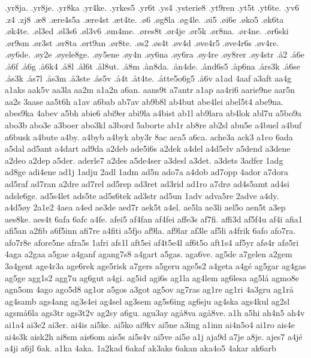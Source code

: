 .yr8ja.
.yr8je.
.yr8ka
.yr4ke.
.yrkes5
.yr6t
.ys4
.ysterie8
.yt9ren
.yt5t
.yt6te.
.yv6
.z4
.zj8
.^^e68
.^^e6re4s5a
.^^e6re4st
.^^e6t4te.
.^^f86
.^^f8g8la
.^^f8g4le.
.^^f8i5
.^^f8i6e
.^^f8ko5
.^^f8k6ta
.^^f8k4te.
.^^f8l3ed
.^^f8l3s6
.^^f8l3v6
.^^f8m4me.
.^^f8res8t
.^^f8r4je
.^^f8r5k
.^^f8r8na.
.^^f8r4ne.
.^^f8r6ski
.^^f8r9sm
.^^f8r3st
.^^f8r8ta
.^^f8rt9an
.^^f8r8te.
.^^f8s2
.^^f8s4t
.^^f8v4d
.^^f8ve4r5
.^^f8ve4r6s
.^^f8v4re.
.^^f8y6de.
.^^f8y2e
.^^f8yele8ge.
.^^f8y5ene
.^^f8y4n
.^^f8y6na
.^^f8y6ra
.^^f8y4re
.^^f8y8rer
.^^f8y4str
.^^e52
.^^e56e
.^^e56f
.^^e56g
.^^e56k4
.^^e58l
.^^e5l6t
.^^e5l8ut.
.^^e58m
.^^e5n8da.
.^^e5n4de.
.^^e5nd6s5
.^^e5p6na
.^^e5rs3k
.^^e56se
.^^e5s3k
.^^e5s7l
.^^e5s3m
.^^e53ste
.^^e5s5v
.^^e54t
.^^e5t4te.
.^^e5tte5o6g5
.^^e56v
a1ad
4aaf
a3aft
aa4g
a1aks
aak5v
aa3la
aa2m
a1a2n
a6an.
aans9t
a7antr
a1ap
aa4ri6
aarie9ne
aar5n
aa2s
3aase
aa5t6h
a1av
a6bab
ab7av
ab9b8l
ab4but
abe4lei
abel5t4
abe9na.
abes9ka
4abev
a5bh
abie6
abi9er
abi9la
a4bist
ab1l
ab9lara
ab4lok
abl7u
a5bo9a
abo3b
abo3e
a3boer
abo3kl
a3bord
5aborte
ab1r
ab8re
ab2sl
abu5e
a4buel
a4buf
a6busk
a4bute
a4by.
a4byb
a4byk
aby3r
8ac
aca5
a6ca.
ache3a
ack3
a1co
6ada
a5dal
ad5ant
a4dart
ad9da
a2deb
ade5i6s
a2dek
a4del
a4d5elv
a5dend
a3dene
a2deo
a2dep
a5der.
aderle7
a2des
a5de4ser
a3desl
a3det.
a3dets
3adfer
1adg
ad8ge
adi4ene
ad1j
1adju
2adl
1adm
ad5n
ado7a
a4dob
ad7opp
4ador
a7dora
ad5raf
ad7ran
a2dre
ad7rel
ad5rep
ad3ret
ad3rid
ad1ro
a7dr^^f8
ad4s5amt
ad4si
adsle6ge.
ad5s4let
ads5te
ad5s6tek
ad3str
ad5un
1adv
adva5re
2adve
a4dy.
a4d5^^f8y
2a1e2
4aea
a4ed
ae3de
aed7r
aek5t
a4el.
ae5la
ae3li
ael5o
aen5t
a3ep
aes8ke.
aes4t
6afa
6afc
a4fe.
afei5
af4fan
af4fei
affe3s
af7fi.
affi3d
af5f4u
af4i
afia1
afi5an
a2fib
a6f5inn
afi7re
a4fiti
a5fjo
af9la.
af9lar
af3le
af5li
a4frik
6afo
afo7ra.
afo7r8e
afore5ne
afra5s
1afri
afs1l
aft5ei
af4t5e4l
af6t5o
aft1s4
af5yr
af^^f84r
af^^f85ri
4aga
a2gaa
a5gae
a4ganf
agang7s8
a4gart
a5gas.
aga6ve.
ag5de
a7gelen
a2gem
3a4gent
age4r3a
age6rek
age5risk
a7gers
a5geru
age5s2
a4geta
a4g^^e9
ag5gar
ag4gas
ag5ge
agg1s2
agg7u
ag6gut
a4gi.
ag5id
agi6s
ag1la
ag4lem
ag6lesa
ag5l^^e5
agmo8e
agn5om
4ago
ago5d8
ag1or
a5gos
a3got
ag5ov
ag7ras
ag1re
ag1ri
4a3gru
ag1r^^e5
ag4samb
ags4ang
ag3s4ei
ag4sel
ag3sem
ag5s6ing
ag6sju
ag4ska
ags4kul
ag2sl
agsm^^e56la
ags3tr
ags3t2v
ag2sy
a6gu.
agu3ay
ag^^e58va
ag^^e58ve.
a1h
a5hi
ah4n5
ah4v
ai1a4
ai3e2
ai3er.
ai4is
ai5ke.
ai5ko
ai9kv
ai5ne
a3ing
a1inn
ai4n5o4
ai1ro
ais4e
ai4s3k
aisk2h
ai8sm
ais6om
ais5s
ai5s4v
ai5ve
ai5^^f8
a1j
aja9d
a7je
a8je.
ajes7
a4j^^e9
a4ji
a6jl
6ak.
a1ka
4aka.
1a2kad
6akaf
ak3aks
6akan
aka4o5
4akar
ak6arb
